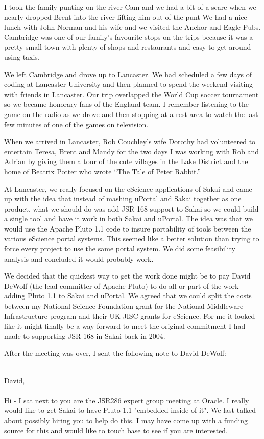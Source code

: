 \documentclass[12pt]{book}
\begin{document}
I took the family punting on the river Cam and we
had a bit of a scare when we nearly dropped Brent into the river
lifting him out of the punt
We had a nice lunch with
John Norman and his wife and we visited the Anchor and Eagle Pubs.
Cambridge was one of our family's favourite stops on the trips because
it was a pretty small town with plenty of shops and restaurants
and easy to get around using taxis.


We left Cambridge and drove up to Lancaster.   We had scheduled a few days
of coding at Lancaster University and then planned to spend the weekend
visiting with friends in Lancaster.  Our trip overlapped the World
Cup soccer tournament so we became honorary fans of the England team.
I remember listening to the game on the radio as we drove and then
stopping at a rest area to watch the last few minutes of one of the games
on television.

When we arrived in Lancaster, Rob Couchley's wife Dorothy had volunteered
to entertain Teresa, Brent and Mandy for the two days I was working with Rob
and Adrian by giving them a tour of the cute villages in the Lake District
and the home of Beatrix Potter who wrote ``The Tale of Peter Rabbit.''

At Lancaster, we really focused on the eScience applications of Sakai and
came up with the idea that instead of mashing uPortal and Sakai
together as one product, what we should do was add JSR-168 support to
Sakai so we could build a single tool and have it work in both Sakai and
uPortal.  The idea was that we would use the Apache Pluto 1.1 code
to insure portability of tools between the various eScience portal systems.
This seemed like a better solution than trying to force every project
to use the same portal system.  We did some feasibility analysis and
concluded it would probably work.

We decided that the quickest way to get the work done might be to pay
David DeWolf (the lead committer of Apache Pluto) to do all or part
of the work adding Pluto 1.1 to Sakai and uPortal.  We agreed that we could split
the costs between my National Science Foundation grant for
the National Middleware Infrastructure program and their UK JISC grants
for eScience.  For me it looked like it might finally be a way forward
to meet the original commitment I had made to supporting JSR-168
in Sakai back in 2004.

After the meeting was over, I sent the following note to David DeWolf:\\
\\
\begin{sf}
David,\\
\\
Hi - I sat next to you are the JSR286 expert group meeting
at Oracle.  I really would like to get Sakai to have Pluto 1.1
"embedded inside of it".  We last talked about possibly hiring
you to help do this.  I may have come up with a funding source
for this and would like to touch base to see if you are interested.\\
\end{sf}
\end{document}
